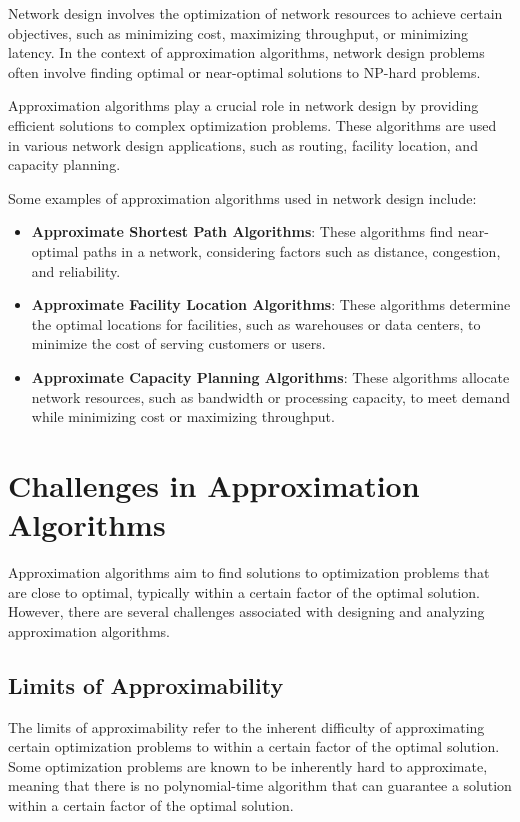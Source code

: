 \documentclass[12pt]{book} %
\begin{document}
Network design involves the optimization of network resources to achieve certain objectives, such as minimizing cost, maximizing throughput, or minimizing latency. In the context of approximation algorithms, network design problems often involve finding optimal or near-optimal solutions to NP-hard problems.


Approximation algorithms play a crucial role in network design by providing efficient solutions to complex optimization problems. These algorithms are used in various network design applications, such as routing, facility location, and capacity planning.


Some examples of approximation algorithms used in network design include:

\begin{itemize}
    \item \textbf{Approximate Shortest Path Algorithms}: These algorithms find near-optimal paths in a network, considering factors such as distance, congestion, and reliability.
    \item \textbf{Approximate Facility Location Algorithms}: These algorithms determine the optimal locations for facilities, such as warehouses or data centers, to minimize the cost of serving customers or users.
    \item \textbf{Approximate Capacity Planning Algorithms}: These algorithms allocate network resources, such as bandwidth or processing capacity, to meet demand while minimizing cost or maximizing throughput.
\end{itemize}


\section{Challenges in Approximation Algorithms}

Approximation algorithms aim to find solutions to optimization problems that are close to optimal, typically within a certain factor of the optimal solution. However, there are several challenges associated with designing and analyzing approximation algorithms.

\subsection{Limits of Approximability}

The limits of approximability refer to the inherent difficulty of approximating certain optimization problems to within a certain factor of the optimal solution. Some optimization problems are known to be inherently hard to approximate, meaning that there is no polynomial-time algorithm that can guarantee a solution within a certain factor of the optimal solution.
\end{document}
